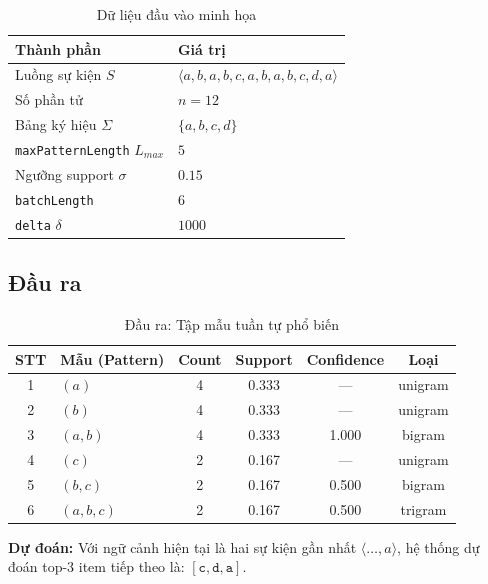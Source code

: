 \documentclass[14pt,a4paper,oneside]{extreport}
\begin{document}
\begin{table}[H]
    \centering
    \caption{Dữ liệu đầu vào minh họa}
    \label{tab:input}
    \begin{tabular}{ll}
        \toprule
        \textbf{Thành phần} & \textbf{Giá trị} \\
        \midrule
        Luồng sự kiện $S$ & $\langle a, b, a, b, c, a, b, a, b, c, d, a \rangle$ \\
        Số phần tử & $n = 12$ \\
        Bảng ký hiệu $\Sigma$ & $\{a, b, c, d\}$ \\
        \texttt{maxPatternLength} $L_{max}$ & $5$ \\
        Ngưỡng support $\sigma$ & $0.15$ \\
        \texttt{batchLength} & $6$ \\
        \texttt{delta} $\delta$ & $1000$ \\
        \bottomrule
    \end{tabular}
\end{table}

\subsection{Đầu ra}

\begin{table}[H]
    \centering
    \caption{Đầu ra: Tập mẫu tuần tự phổ biến}
    \label{tab:output}
    \begin{tabular}{clcccc}
        \toprule
        \textbf{STT} & \textbf{Mẫu (Pattern)} & \textbf{Count} & \textbf{Support} & \textbf{Confidence} & \textbf{Loại} \\
        \midrule
        1 & $(a)$        & 4 & 0.333 & ---   & unigram \\
        2 & $(b)$        & 4 & 0.333 & ---   & unigram \\
        3 & $(a, b)$     & 4 & 0.333 & 1.000 & bigram \\
        4 & $(c)$        & 2 & 0.167 & ---   & unigram \\
        5 & $(b, c)$     & 2 & 0.167 & 0.500 & bigram \\
        6 & $(a, b, c)$  & 2 & 0.167 & 0.500 & trigram \\
        \bottomrule
    \end{tabular}
\end{table}

\textbf{Dự đoán:} Với ngữ cảnh hiện tại là hai sự kiện gần nhất $\langle \dots, a \rangle$, hệ thống dự đoán top-3 item tiếp theo là: $[\texttt{c}, \texttt{d}, \texttt{a}]$.
\end{document}
